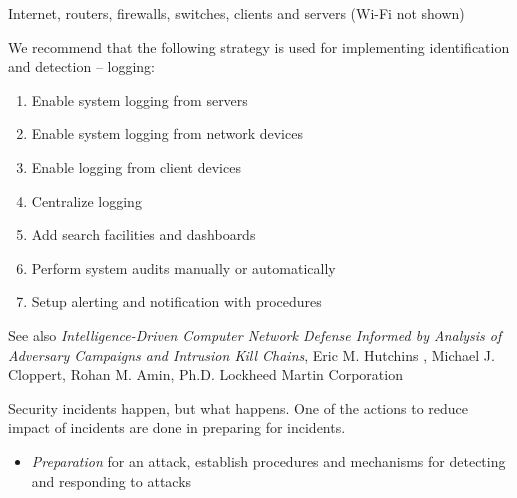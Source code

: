\documentclass[Screen16to9,17pt]{foils}
\begin{document}
\begin{list2}
\item Internet, routers, firewalls, switches, clients and servers (Wi-Fi not shown)
\end{list2}



We recommend that the following strategy is used for implementing identification and detection -- logging:
\begin{enumerate}
\item[\faSquareO] Enable system logging from servers
\item[\faSquareO] Enable system logging from network devices
\item[\faSquareO] Enable logging from client devices
\item[\faSquareO] Centralize logging
\item[\faSquareO] Add search facilities and dashboards
\item[\faSquareO] Perform system audits manually or automatically
\item[\faSquareO] Setup alerting and notification with procedures
\end{enumerate}






\begin{list2}
\item See also \emph{Intelligence-Driven Computer Network Defense Informed by Analysis of Adversary Campaigns and Intrusion Kill Chains}, Eric M. Hutchins , Michael J. Cloppert, Rohan M. Amin, Ph.D. Lockheed Martin Corporation\\{\footnotesize
 }
\end{list2}





Security incidents happen, but what happens. One of the actions to reduce impact of incidents are done in preparing for incidents.

\begin{itemize}
\item \emph{Preparation} for an attack, establish procedures and mechanisms for detecting and responding to attacks
\end{itemize}
\end{document}
